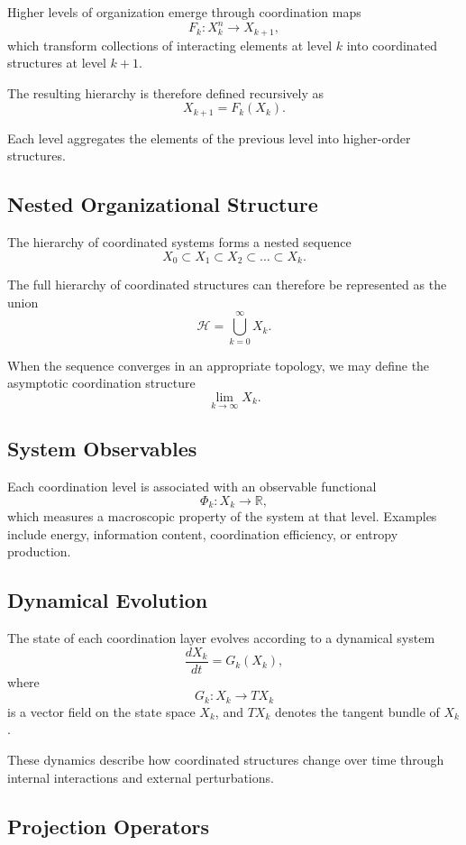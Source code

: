 \documentclass[12pt]{article}
\begin{document}
Higher levels of organization emerge through coordination maps
\[
F_k : X_k^n \rightarrow X_{k+1},
\]
which transform collections of interacting elements at level $k$ into coordinated structures at level $k+1$.

The resulting hierarchy is therefore defined recursively as
\[
X_{k+1} = F_k(X_k).
\]

Each level aggregates the elements of the previous level into higher-order structures.

\subsection{Nested Organizational Structure}

The hierarchy of coordinated systems forms a nested sequence
\[
X_0 \subset X_1 \subset X_2 \subset \dots \subset X_k .
\]

The full hierarchy of coordinated structures can therefore be represented as the union
\[
\mathcal{H} = \bigcup_{k=0}^{\infty} X_k .
\]

When the sequence converges in an appropriate topology, we may define the asymptotic coordination structure
\[
\lim_{k \to \infty} X_k .
\]

\subsection{System Observables}

Each coordination level is associated with an observable functional
\[
\Phi_k : X_k \rightarrow \mathbb{R},
\]
which measures a macroscopic property of the system at that level. Examples include energy, information content, coordination efficiency, or entropy production.

\subsection{Dynamical Evolution}

The state of each coordination layer evolves according to a dynamical system
\[
\frac{dX_k}{dt} = G_k(X_k),
\]
where
\[
G_k : X_k \rightarrow T X_k
\]
is a vector field on the state space $X_k$, and $T X_k$ denotes the tangent bundle of $X_k$.

These dynamics describe how coordinated structures change over time through internal interactions and external perturbations.

\subsection{Projection Operators}
\end{document}
